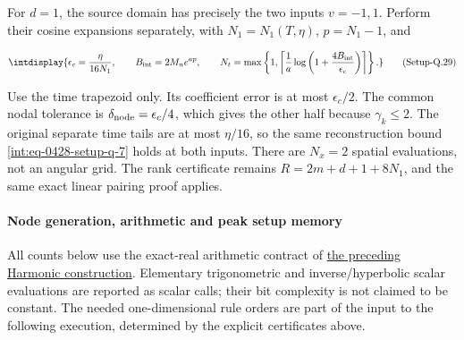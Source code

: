 
For \(d=1\), the source domain has precisely the two inputs \(v=-1,\allowbreak 1\). Perform their cosine expansions separately, with \(N_1=N_1(T,\allowbreak \eta)\), \(p=N_1-1\), and


\label{int:eq-setup-q-29}
\begingroup\renewcommand{\theHequation}{intdisplay.902}
\begin{equation}
\intdisplay{
\epsilon_c=\frac{\eta}{16N_1},\qquad
B_{\rm int}=2M_ne^{ap},\qquad
N_t=\max\left\{1,
\left\lceil\frac1a\log\left(1+\frac{4B_{\rm int}}{\epsilon_c}\right)
\right\rceil\right\}.
}
\tag{Setup-Q.29}
\label{int:eq-0450-setup-q-29}
\end{equation}
\endgroup


Use the time trapezoid only. Its coefficient error is at most \(\epsilon_c/2\). The common nodal tolerance is \(\delta_{\rm node}=\epsilon_c/4\), which gives the other half because \(\gamma_k\le2\). The original separate time tails are at most \(\eta/16\), so the same reconstruction bound \hyperref[int:eq-setup-q-7]{\eqref{int:eq-0428-setup-q-7}} holds at both inputs. There are \(N_x=2\) spatial evaluations, not an angular grid. The rank certificate remains \(R=2m+d+1+8N_1\), and the same exact linear pairing proof applies.


\paragraph{Node generation, arithmetic and peak setup memory}
\label{int:setup-quadrature-6}
\mbox{}\par\smallskip


All counts below use the exact-real arithmetic contract of \hyperref[int:harmonic-construction]{the preceding Harmonic construction}. Elementary trigonometric and inverse/hyperbolic scalar evaluations are reported as scalar calls; their bit complexity is not claimed to be constant. The needed one-dimensional rule orders are part of the input to the following execution, determined by the explicit certificates above.



